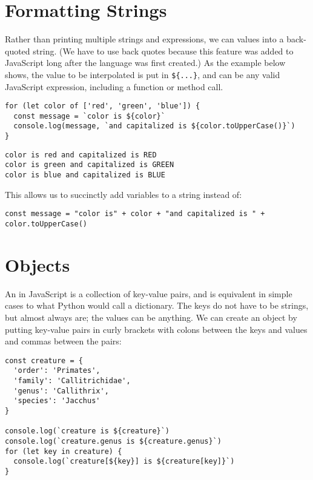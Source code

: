 \section{Formatting Strings}\label{s:basics-formatting}

Rather than printing multiple strings and expressions,
we can  values into a back-quoted string.
(We have to use back quotes because this feature was added to JavaScript
long after the language was first created.)
As the example below shows,
the value to be interpolated is put in \texttt{\$\{...\}},
and can be any valid JavaScript expression,
including a function or method call.

\begin{verbatim}
for (let color of ['red', 'green', 'blue']) {
  const message = `color is ${color}`
  console.log(message, `and capitalized is ${color.toUpperCase()}`)
}
\end{verbatim}

\begin{verbatim}
color is red and capitalized is RED
color is green and capitalized is GREEN
color is blue and capitalized is BLUE
\end{verbatim}

This allows us to succinctly add variables to a string instead of:

\begin{verbatim}
const message = "color is" + color + "and capitalized is " + color.toUpperCase()
\end{verbatim}

\section{Objects}\label{s:basics-objects}

An  in JavaScript is a collection of key-value pairs,
and is equivalent in simple cases to what Python would call a dictionary.
The keys do not have to be strings,
but almost always are;
the values can be anything.
We can create an object by putting key-value pairs in curly brackets
with colons between the keys and values
and commas between the pairs:

\begin{verbatim}
const creature = {
  'order': 'Primates',
  'family': 'Callitrichidae',
  'genus': 'Callithrix',
  'species': 'Jacchus'
}

console.log(`creature is ${creature}`)
console.log(`creature.genus is ${creature.genus}`)
for (let key in creature) {
  console.log(`creature[${key}] is ${creature[key]}`)
}
\end{verbatim}

